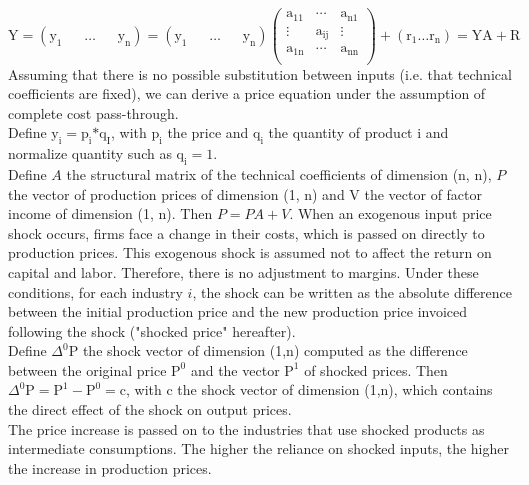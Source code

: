 \documentclass[11pt,a4paper]{article}
\begin{document}
	$\text{Y}=\left( {{\text{y}}_{1}}\text{ }\!\!~\!\!\text{ }\ldots \text{ }\!\!~\!\!\text{ }{{\text{y}}_{\text{n}}} \right)=\left( {{\text{y}}_{1}}\text{ }\!\!~\!\!\text{ }\ldots \text{ }\!\!~\!\!\text{ }{{\text{y}}_{\text{n}}} \right)\left( \begin{matrix}
   {{\text{a}}_{11}} & \cdots  & {{\text{a}}_{\text{n}1}}  \\
   \vdots  & {{\text{a}}_{\text{ij}}} & \vdots   \\
   {{\text{a}}_{1\text{n}}} & \cdots  & {{\text{a}}_{\text{nn}}}  \\
\end{matrix} \right)+\left( {{\text{r}}_{1}}\ldots {{\text{r}}_{\text{n}}} \right)=\text{YA}+\text{R}$\\
Assuming that there is no possible substitution between inputs (i.e. that technical coefficients are fixed), we can derive a price equation under the assumption of complete cost pass-through.\\
Define ${{\text{y}}_{\text{i}}}={{\text{p}}_{\text{i}}}\text{*}{{\text{q}}_{\text{I}}}$, with ${{\text{p}}_{\text{i}}}$ the price and ${{\text{q}}_{\text{i}}}$ the quantity of product $\text{i}$ and normalize quantity such as ${{\text{q}}_{\text{i}}}=1$. \\
Define $A$ the structural matrix of the technical coefficients of dimension (n, n), $P$ the vector of production prices of dimension (1, n) and V the vector of factor income of dimension (1, n). Then $P=PA+V$.
When an exogenous input price shock occurs, firms face a change in their costs, which is passed on directly to production prices. This exogenous shock is assumed not to affect the return on capital and labor. Therefore, there is no adjustment to margins. Under these conditions, for each industry $i$, the shock can be written as the absolute difference between the initial production price and the new production price invoiced following the shock ("shocked price" hereafter).\\
Define ${{\Delta }^{0}}\text{P}$ the shock vector of dimension (1,n) computed as the difference between the original price ${{\text{P}}^{0}}$ and the vector ${{\text{P}}^{1}}$ of shocked prices. Then ${{\Delta }^{0}}\text{P}={{\text{P}}^{1}}-{{\text{P}}^{0}}=\text{c}$, with $\text{c}$ the shock vector of dimension (1,n), which contains the direct effect of the shock on output prices.\\
The price increase is passed on to the industries that use shocked products as intermediate consumptions. The higher the reliance on shocked inputs, the higher the increase in production prices.\\
\end{document}
